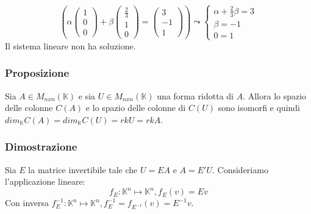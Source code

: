 \documentclass[12pt]{article}
\begin{document}
\[\left(\alpha \begin{pmatrix}
    1\\
    0\\
    0
\end{pmatrix} + \beta \begin{pmatrix}
    \frac{2}{3}\\
    1\\
    0
\end{pmatrix} = \begin{pmatrix}
    3\\
    -1\\
    1
\end{pmatrix}\right) \leadsto \begin{cases}
    \alpha + \frac{2}{3}\beta = 3\\
    \beta = -1\\
    0 = 1
\end{cases}\]
Il sistema lineare non ha soluzione.

\subsubsection{Proposizione} Sia $A \in M_{nxn} (\mathbb{K})$ e sia $U \in M_{nxn}(\mathbb{K})$ una forma ridotta di $A$. Allora lo spazio delle colonne $C(A)$ e lo spazio delle colonne di $C(U)$ sono isomorfi e quindi $dim_{\mathbb{K}}C(A) = dim_{\mathbb{K}}C(U) = rkU = rkA$.

\subsubsection{Dimostrazione}
Sia $E$ la matrice invertibile tale che $U = EA$ e $A = E'U$.
Consideriamo l'applicazione lineare:
\[f_E: \mathbb{K}^n \mapsto \mathbb{K}^n, f_E(v) = Ev\]
Con inversa $f_E^{-1}: \mathbb{K}^n \mapsto \mathbb{K}^n, f_E^{-1} = f_{E^{-1}}(v) = E^{-1}v$.
\end{document}
